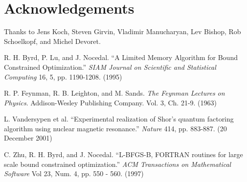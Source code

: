 \documentclass[twocolumn]{revtex4}
\begin{document}
\section{Acknowledgements}
Thanks to Jens Koch, Steven Girvin, Vladimir Manucharyan, Lev Bishop,
Rob Schoelkopf, and Michel Devoret.

\begin{thebibliography}{9}
 R. H. Byrd, P. Lu, and J. Nocedal. ``A Limited Memory
  Algorithm for Bound Constrained Optimization.'' \textit{SIAM Journal
    on Scientific and Statistical Computing} 16, 5,
  pp. 1190-1208. (1995)
  
 R. P. Feynman, R. B. Leighton, and
  M. Sands. \textit{The Feynman Lectures on Physics}. Addison-Wesley
  Publishing Company. Vol. 3, Ch. 21-9. (1963)

 L. Vandersypen et al. ``Experimental realization
  of Shor's quantum factoring algorithm using nuclear magnetic
  resonance.'' \textit{Nature} 414, pp. 883-887. (20 December 2001)
  
 C. Zhu, R. H. Byrd, and J. Nocedal. ``L-BFGS-B, FORTRAN
  routines for large scale bound constrained optimization.''
  \textit{ACM Transactions on Mathematical Software} Vol 23, Num. 4,
  pp. 550 - 560. (1997)

\end{thebibliography}
\end{document}
